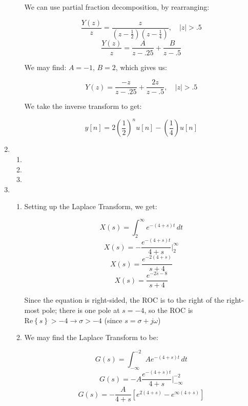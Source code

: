 \begin{enumerate}
\begin{enumerate}
        We can use partial fraction decomposition, by rearranging:

        $$\frac{Y(z)}{z}=\frac{z}{\left( z-\frac{1}{2} \right)\left( z-\frac{1}{4} \right)},\quad |z|>.5$$
        $$\frac{Y(z)}{z}=\frac{A}{z-.25}+\frac{B}{z-.5}$$

        We may find: $A=-1$, $B=2$, which gives us:

        $$Y(z)=\frac{-z}{z-.25}+\frac{2z}{z-.5},\quad |z|>.5$$

        We take the inverse transform to get:

        $$\boxed{y[n]=2\left( \frac{1}{2} \right)^nu[n]-\left(\frac{1}{4}\right)u[n]}$$

    \end{enumerate}

  \item

    \begin{enumerate}

      \item 

      \item 

      \item 

    \end{enumerate}

  \item

    \begin{enumerate}

      \item 

        Setting up the Laplace Transform, we get:

        $$X(s)=\int_{2}^{\infty}e^{-(4+s)t}\,dt$$
        $$X(s)=-\frac{e^{-(4+s)t}}{4+s}\Big|_2^{\infty}$$
        $$X(s)=\frac{e^{-2(4+s)}}{s+4}$$
        $$\boxed{X(s)=\frac{e^{-2s-8}}{s+4}}$$

        Since the equation is right-sided, the ROC is to the right of the right-most pole; there is one pole at $s=-4$, so the ROC is $\text{Re}\left\{ s \right\}>-4\longrightarrow \sigma >-4$ (since $s=\sigma+j\omega$)

      \item 

        We may find the Laplace Transform to be:

        $$G(s)=\int_{-\infty}^{-2} Ae^{-(4+s)t}\,dt$$
        $$G(s)=-A\frac{e^{-(4+s)t}}{4+s}\Big|_{-\infty}^{-2}$$
        $$G(s)=-\frac{A}{4+s}\left[e^{2(4+s)}-e^{\infty(4+s)}\right]$$


\end{enumerate}
\end{enumerate}
